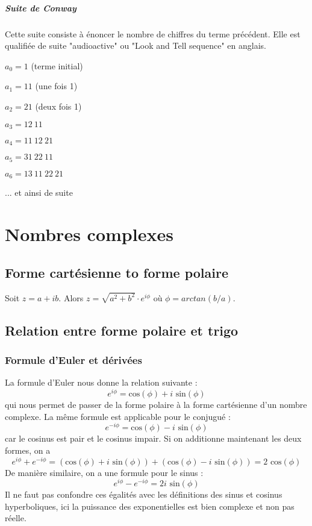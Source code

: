 \documentclass[10pt,a4paper]{book}
\begin{document}
\paragraph{Suite de Conway}
Cette suite consiste à énoncer le nombre de chiffres du terme précédent.  Elle est qualifiée de suite "audioactive" ou "Look and Tell sequence" en anglais.\par 
$a_0 = 1$ (terme initial)\par 
$a_1 = 11$ (une fois 1)\par
$a_2 = 21$ (deux fois 1)\par 
$a_3 = 12\ 11$\par 
$a_4 = 11\ 12\ 21$\par 
$a_5 = 31\ 22\ 11$\par 
$a_6 = 13\ 11\ 22\ 21$\par 
... et ainsi de suite

\chapter{Nombres complexes}
\section{Forme cartésienne to forme polaire}
Soit $z=a+ib$. Alors $z=\sqrt{a^2+b^2}\cdot e^{i\phi}$ où $\phi=arctan(b/a)$.

\section{Relation entre forme polaire et trigo}
\subsection{Formule d'Euler et dérivées}
La formule d'Euler nous donne la relation suivante :
\[e^{i\phi} = \text{cos}(\phi)+i\text{ sin}(\phi)\]
qui nous permet de passer de la forme polaire à la forme cartésienne d'un nombre complexe. La même formule est applicable pour le conjugué :
\[e^{-i\phi} = \text{cos}(\phi)-i\text{ sin}(\phi)\]
car le cosinus est pair et le cosinus impair. Si on additionne maintenant les deux formes, on a
\[e^{i\phi}+e^{-i\phi} = (\text{cos}(\phi) + i\text{ sin}(\phi)) + (\text{cos}(\phi) - i\text{ sin}(\phi)) = 2\text{ cos}(\phi)\]
De manière similaire, on a une formule pour le sinus :
\[e^{i\phi}-e^{-i\phi} = 2i\text{ sin}(\phi)\]
Il ne faut pas confondre ces égalités avec les définitions des sinus et cosinus hyperboliques, ici la puissance des exponentielles est bien complexe et non pas réelle.
\end{document}
